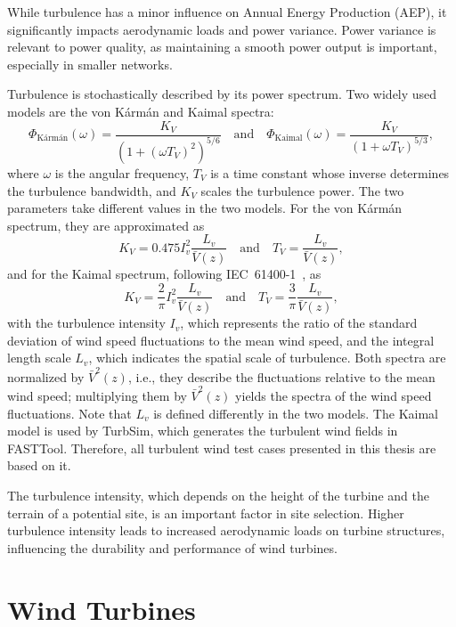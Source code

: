 While turbulence has a minor influence on Annual Energy Production (AEP), it significantly impacts aerodynamic loads and power variance. Power variance is relevant to power quality, as maintaining a smooth power output is important, especially in smaller networks.

Turbulence is stochastically described by its power spectrum. Two widely used models are the von K\'arm\'an and Kaimal spectra:
\begin{equation}
    \Phi_{\text{K\'arm\'an}}(\omega) = \frac{K_V}{(1 +(\omega T_V)^2)^{5/6}} \quad \text{and} \quad
    \Phi_{\text{Kaimal}}(\omega) = \frac{K_V}{(1 +\omega T_V)^{5/3}},
\end{equation}
where $\omega$ is the angular frequency, $T_V$ is a time constant whose inverse determines the turbulence bandwidth, and $K_V$ scales the turbulence power. The two parameters take different values in the two models. For the von K\'arm\'an spectrum, they are approximated as~\cite{Bianchi2007}
\begin{equation}
    K_V = 0.475 I_v^2 \frac{L_v}{\bar{V}(z)} \quad \text{and} \quad T_V = \frac{L_v}{\bar{V}(z)},
\end{equation}
and for the Kaimal spectrum, following IEC~61400-1~\cite{IEC61400-1}, as
\begin{equation}
    K_V = \frac{2}{\pi} I_v^2 \frac{L_v}{\bar{V}(z)} \quad \text{and} \quad T_V = \frac{3}{\pi}\frac{L_v}{\bar{V}(z)},
\end{equation}
with the turbulence intensity $I_v$, which represents the ratio of the standard deviation of wind speed fluctuations to the mean wind speed, and the integral length scale $L_v$, which indicates the spatial scale of turbulence. Both spectra are normalized by $\bar{V}^2(z)$, i.e., they describe the fluctuations relative to the mean wind speed; multiplying them by $\bar{V}^2(z)$ yields the spectra of the wind speed fluctuations. Note that $L_v$ is defined differently in the two models. The Kaimal model is used by TurbSim, which generates the turbulent wind fields in FASTTool. Therefore, all turbulent wind test cases presented in this thesis are based on it.


The turbulence intensity, which depends on the height of the turbine and the terrain of a potential site, is an important factor in site selection. Higher turbulence intensity leads to increased aerodynamic loads on turbine structures, influencing the durability and performance of wind turbines.

\section{Wind Turbines} \label{sec:WindTurbines}

